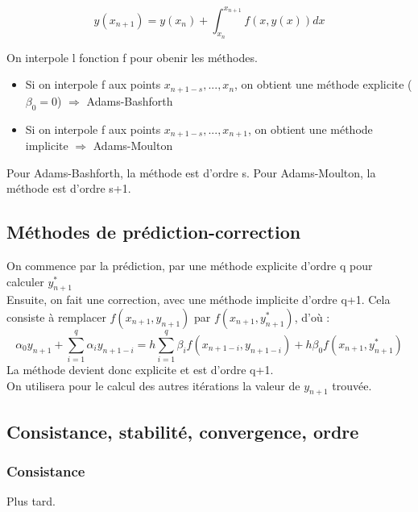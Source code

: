 \[y(x_{n+1})=y(x_n)+\int_{x_n}^{x_{n+1}} f(x,y(x))dx\]

On interpole l fonction f pour obenir les méthodes.
\begin{itemize}
	\item Si on interpole f aux points $x_{n+1-s},...,x_n$, on obtient une méthode explicite ($\beta_0=0$) $\Rightarrow$ Adams-Bashforth
	\item Si on interpole f aux points $x_{n+1-s},...,x_{n+1}$, on obtient une méthode implicite $\Rightarrow$ Adams-Moulton
\end{itemize}

\bigskip
Pour Adams-Bashforth, la méthode est d'ordre s. Pour Adams-Moulton, la méthode est d'ordre s+1.

\subsection{Méthodes de prédiction-correction}

On commence par la prédiction, par une méthode explicite d'ordre q pour calculer $y_{n+1}^*$\\
Ensuite, on fait une correction, avec une méthode implicite d'ordre q+1. Cela consiste à remplacer $f(x_{n+1},y_{n+1})$ par $f(x_{n+1},y_{n+1}^*)$, d'où :
\[\alpha_0 y_{n+1}+\sum_{i=1}^q \alpha_i y_{n+1-i}=h\sum_{i=1}^q \beta_i f(x_{n+1-i},y_{n+1-i}) +h\beta_0 f(x_{n+1},y_{n+1}^*)\]
La méthode devient donc explicite et est d'ordre q+1.\\
On utilisera pour le calcul des autres itérations la valeur de $y_{n+1}$ trouvée.

\subsection{Consistance, stabilité, convergence, ordre}
\subsubsection{Consistance}


\begin{dem}
	Plus tard.
\end{dem}

